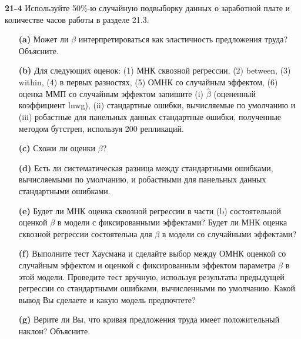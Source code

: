 \textbf{21-4} Используйте 50\%-ю случайную подвыборку данных о заработной плате и количестве часов работы в разделе 21.3.
\begin{itemize}
\item[{\bf (a)}] Может ли $\beta$ интерпретироваться как эластичность предложения труда? Объясните.

\item[{\bf (b)}] Для следующих оценок: (1) МНК сквозной регрессии, (2)  between, (3) within, (4)  в первых разностях, (5) ОМНК со случайным эффектом, (6) оценка ММП со случайным эффектом запишите (i) $\hat{\beta}$ (оцененный коэффициент lnwg), (ii) стандартные ошибки, вычисляемые по умолчанию и (iii) робастные для панельных данных стандартные ошибки, полученные методом бутстреп, используя 200 репликаций.

\item[{\bf (c)}] Схожи ли оценки $\beta$?

\item[{\bf (d)}] Есть ли систематическая разница между стандартными ошибками, вычисляемыми по умолчанию, и робастными для панельных данных стандартными ошибками.

\item[{\bf (e)}] Будет ли МНК оценка сквозной регрессии в части (b)  состоятельной оценкой $\beta$ в модели с фиксированными эффектами? Будет ли МНК оценка сквозной регрессии состоятельна для $\beta$ в модели со случайными эффектами?

\item[{\bf (f)}] Выполните тест Хаусмана и сделайте выбор между ОМНК оценкой со случайным эффектом и оценкой с фиксированным эффектом параметра $\beta$ в этой модели. Проведите тест вручную, используя результаты предыдущей регрессии со стандартными ошибками, вычисленными по умолчанию. Какой вывод Вы сделаете и какую модель предпочтете?

\item[{\bf (g)}] Верите ли Вы, что кривая предложения труда имеет положительный наклон? Объясните.

\end{itemize}
